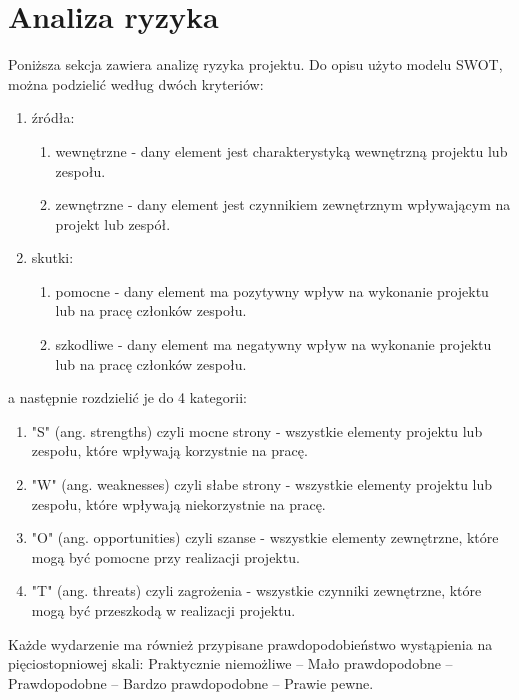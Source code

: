 \chapter{Analiza ryzyka}
Poniższa sekcja zawiera analizę ryzyka projektu. Do opisu użyto modelu SWOT, można podzielić według dwóch kryteriów: 
\begin{enumerate}
    \item źródła:
    \begin{enumerate}
        \item wewnętrzne - dany element jest charakterystyką wewnętrzną projektu lub zespołu.
        \item zewnętrzne - dany element jest czynnikiem zewnętrznym wpływającym na projekt lub zespół.
    \end{enumerate}
    \item skutki:
    \begin{enumerate}
        \item pomocne - dany element ma pozytywny wpływ na wykonanie projektu lub na pracę członków zespołu.
        \item szkodliwe - dany element ma negatywny wpływ na wykonanie projektu lub na pracę członków zespołu.
    \end{enumerate}
\end{enumerate}
a następnie rozdzielić je do 4 kategorii: 
\begin{enumerate}
    \item "S" (ang. strengths) czyli mocne strony - wszystkie elementy projektu lub zespołu, które wpływają korzystnie na pracę.
    \item "W" (ang. weaknesses) czyli słabe strony - wszystkie elementy projektu lub zespołu, które wpływają niekorzystnie na pracę.
    \item "O" (ang. opportunities) czyli szanse - wszystkie elementy zewnętrzne, które mogą być pomocne przy realizacji projektu.
    \item "T" (ang. threats) czyli zagrożenia - wszystkie czynniki zewnętrzne, które mogą być przeszkodą w realizacji projektu.
\end{enumerate}
Każde wydarzenie ma również przypisane prawdopodobieństwo wystąpienia na pięciostopniowej skali: Praktycznie niemożliwe -- Mało prawdopodobne -- Prawdopodobne -- Bardzo prawdopodobne -- Prawie pewne.
